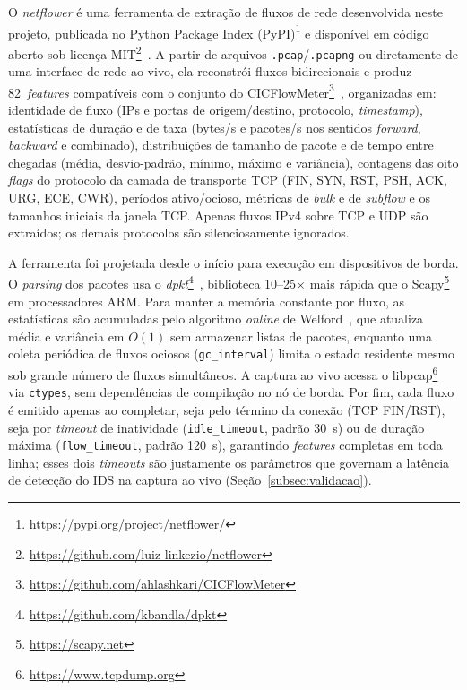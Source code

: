 \documentclass[12pt,a4paper]{article}
\begin{document}
O \textit{netflower} é uma ferramenta de extração de fluxos de rede
desenvolvida neste projeto, publicada no Python Package Index
(PyPI)\footnote{\url{https://pypi.org/project/netflower/}} e disponível em
código aberto sob licença
MIT\footnote{\url{https://github.com/luiz-linkezio/netflower}}~\cite{netflower}.
A partir de arquivos \texttt{.pcap}/\texttt{.pcapng} ou diretamente de uma
interface de rede ao vivo, ela reconstrói fluxos bidirecionais e produz
82~\textit{features} compatíveis com o conjunto do
CICFlowMeter\footnote{\url{https://github.com/ahlashkari/CICFlowMeter}}~\cite{cicflowmeter},
organizadas em: identidade de fluxo (IPs e portas de origem/destino, protocolo,
\textit{timestamp}), estatísticas de duração e de taxa (bytes/s e pacotes/s nos
sentidos \textit{forward}, \textit{backward} e combinado), distribuições de
tamanho de pacote e de tempo entre chegadas (média, desvio-padrão, mínimo,
máximo e variância), contagens das oito \textit{flags} do protocolo da camada
de transporte TCP (FIN, SYN, RST, PSH, ACK, URG, ECE, CWR), períodos
ativo/ocioso, métricas de \textit{bulk} e de \textit{subflow} e os tamanhos
iniciais da janela TCP. Apenas fluxos IPv4 sobre TCP e UDP são extraídos; os
demais protocolos são silenciosamente ignorados.

A ferramenta foi projetada desde o início para execução em dispositivos de
borda. O \textit{parsing} dos pacotes usa o
\textit{dpkt}\footnote{\url{https://github.com/kbandla/dpkt}}~\cite{dpkt},
biblioteca 10--25$\times$ mais rápida que o
Scapy\footnote{\url{https://scapy.net}}~\cite{scapy} em processadores ARM. Para
manter a memória constante por fluxo, as estatísticas são acumuladas pelo
algoritmo \textit{online} de Welford~\cite{welford}, que atualiza média e
variância em $O(1)$ sem armazenar listas de pacotes, enquanto uma coleta
periódica de fluxos ociosos (\texttt{gc\_interval}) limita o estado residente
mesmo sob grande número de fluxos simultâneos. A captura ao vivo acessa o
libpcap\footnote{\url{https://www.tcpdump.org}}~\cite{libpcap} via
\texttt{ctypes}, sem dependências de compilação no nó de borda. Por fim, cada fluxo é emitido apenas ao completar, seja pelo término da
conexão (TCP FIN/RST), seja por \textit{timeout} de inatividade
(\texttt{idle\_timeout}, padrão 30~s) ou de duração máxima
(\texttt{flow\_timeout}, padrão 120~s), garantindo \textit{features} completas
em toda linha; esses dois \textit{timeouts} são justamente os parâmetros que
governam a latência de detecção do IDS na captura ao vivo
(Seção~\ref{subsec:validacao}).
\end{document}
